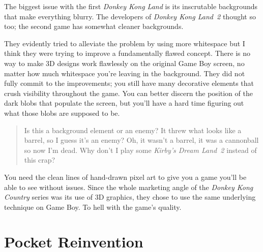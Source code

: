 \documentclass{book}
\let\oldcenter\center
\let\oldendcenter\endcenter
\renewenvironment{center}{\setlength\topsep{0pt}\oldcenter}{\oldendcenter}
\begin{document}
The biggest issue with the first \emph{Donkey Kong Land} is its inscrutable backgrounds that make everything blurry. The developers of \emph{Donkey Kong Land 2} thought so too; the second game has somewhat cleaner backgrounds.

\begin{center}
\vspace{8pt}
\quad\vspace{4pt}
\quad\vspace{4pt}
\quad\vspace{4pt}
\end{center}

They evidently tried to alleviate the problem by using more whitespace but I think they were trying to improve a fundamentally flawed concept. There is no way to make 3D designs work flawlessly on the original Game Boy screen, no matter how much whitespace you’re leaving in the background. They did not fully commit to the improvements; you still have many decorative elements that crush visibility throughout the game. You can better discern the position of the dark blobs that populate the screen, but you’ll have a hard time figuring out what those blobs are supposed to be.

\begin{quote}
Is this a background element or an enemy? It threw what looks like a barrel, so I guess it’s an enemy? Oh, it wasn’t a barrel, it was a cannonball so now I’m dead. Why don’t I play some \emph{Kirby’s Dream Land 2} instead of this crap?
\end{quote} \par

You need the clean lines of hand-drawn pixel art to give you a game you’ll be able to see without issues. Since the whole marketing angle of the \emph{Donkey Kong Country} series was its use of 3D graphics, they chose to use the same underlying technique on Game Boy. To hell with the game’s quality.

\FloatBarrier\needspace{10mm}\section*{Pocket Reinvention}\nopagebreak[4]
\end{document}
